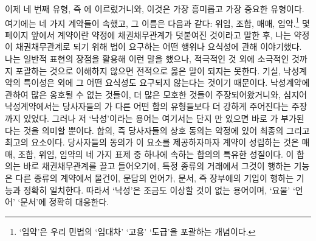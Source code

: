 이제 네 번째 유형, 즉 에 이르렀거니와,
이것은 가장 흥미롭고 가장 중요한 유형이다.
여기에는 네 가지 계약들이 속했고, 그 이름은 다음과 같다:
위임, 조합,
매매, 임약.\footnote{%
  `임약'은 우리 민법의 `임대차' `고용' `도급'을 포괄하는 개념이다. }
몇 페이지 앞에서
계약이란 약정에 채권채무관계가 덧붙여진 것이라고 말한 후,
나는
약정이 채권채무관계로 되기 위해 법이 요구하는
어떤 행위나 요식성에 관해 이야기했다.
나는 일반적 표현의 장점을 활용해 이런 말을 했으나,
적극적인 것 외에 소극적인 것까지 포괄하는 것으로 이해하지 않으면
전적으로 옳은 말이 되지는 못한다.
기실,
낙성계약의 특이성은  외에 그 어떤 요식성도
 요구되지 않는다는 것이기 때문이다.
낙성계약에 관하여 많은 옹호될 수 없는 것들이,
더 많은 모호한 것들이 주장되어왔거니와,
심지어 낙성계약에서는 당사자들의 가
다른 어떤 합의 유형들보다 더 강하게 주어진다는 주장까지 있었다.
그러나 저 `낙성'이라는 용어는
여기서는
단지 만 있으면 바로 가
부가된다는 것을 의미할 뿐이다.
합의, 즉 당사자들의 상호 동의는
약정에 있어 최종의 그리고 최고의 요소이다.
당사자들의 동의가 이 요소를 제공하자마자
 계약이 성립하는 것은
매매, 조합, 위임, 임약의 네 가지 표제 중 하나에 속하는
합의의 특유한 성질이다.
이 합의는 바로 채권채무관계를 끌고 들어오기에,
특정 종류의 거래에서 그것이 행하는 기능은
다른 종류의 계약에서 물건이, 문답의 언어가,
문서, 즉 장부에의 기입이 행하는 기능과 정확히 일치한다.
따라서 `낙성'은
조금도 이상할 것이 없는 용어이며,
`요물' `언어' `문서'에 정확히 대응한다.


